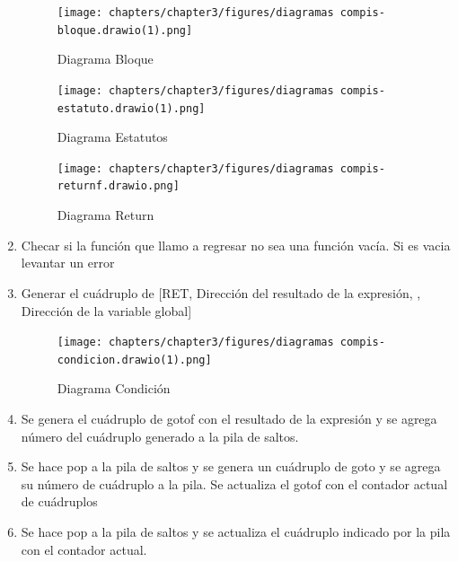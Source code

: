 \begin{enumerate}
    \newpage
    
    
    \begin{figure}[!htbp]
            \centering
            \texttt{[image: chapters/chapter3/figures/diagramas compis-bloque.drawio(1).png]}
            \caption{Diagrama Bloque}
            \label{fig:my_label}
    \end{figure}
    \FloatBarrier
    
    \begin{figure}[!htbp]
            \centering
            \texttt{[image: chapters/chapter3/figures/diagramas compis-estatuto.drawio(1).png]}
            \caption{Diagrama Estatutos}
            \label{fig:my_label}
    \end{figure}
    \FloatBarrier
    \begin{figure}[!htbp]
            \centering
            \texttt{[image: chapters/chapter3/figures/diagramas compis-returnf.drawio.png]}
            \caption{Diagrama Return}
            \label{fig:my_label}
    \end{figure}
    \FloatBarrier
    \item Checar si la función que llamo a regresar no sea una función vacía. Si es vacia levantar un error
    \item Generar el cuádruplo de [RET, Dirección del resultado de la expresión, , Dirección de la variable global]
    
    \newpage
    
    \begin{figure}[!htbp]
            \centering
            \texttt{[image: chapters/chapter3/figures/diagramas compis-condicion.drawio(1).png]}
            \caption{Diagrama Condición}
            \label{fig:my_label}
    \end{figure}
    \FloatBarrier
    
    \item Se genera el cuádruplo de gotof con el resultado de la expresión y se agrega número del cuádruplo generado a la pila de saltos.
    \item Se hace pop a la pila de saltos y se genera un cuádruplo de goto y se agrega su número de cuádruplo a la pila. Se actualiza el gotof con el contador actual de cuádruplos
    \item Se hace pop a la pila de saltos y se actualiza el cuádruplo indicado por la pila con el contador actual.
    
    \newpage
    

\end{enumerate}
